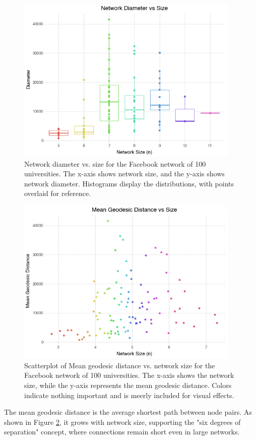 \documentclass[12pt]{article}
\begin{document}
\begin{figure}[t]
    \centering
    \includegraphics[width=0.95\textwidth]{../figures/diameter_vs_size.png}
    \caption{Network diameter vs. size for the Facebook network of 100 universities. The x-axis shows network size, and the y-axis shows network diameter. Histograms display the distributions, with points overlaid for reference. }
    \label{fig:diameter_vs_size}
\end{figure}

\begin{figure}[t]
    \centering
    \includegraphics[width=0.95\textwidth]{../figures/mean_geodesic_distance_vs_size.png}
    \caption{Scatterplot of Mean geodesic distance vs. network size for the Facebook network of 100 universities. The x-axis shows the network size, while the y-axis represents the mean geodesic distance. Colors indicate nothing important and is meerly included for visual effects. }
    \label{fig:mean_geodesic_distance_vs_size}
\end{figure}
The mean geodesic distance is the average shortest path between node pairs. As shown in Figure \ref{fig:mean_geodesic_distance_vs_size}, it grows with network size, supporting the "six degrees of separation" concept, where connections remain short even in large networks.\\
\end{document}
